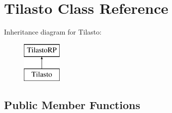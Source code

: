 \hypertarget{class_tilasto}{\section{Tilasto Class Reference}
\label{class_tilasto}
}
Inheritance diagram for Tilasto\-:\begin{figure}[H]
\begin{center}
\leavevmode
\includegraphics[height=2.000000cm]{class_tilasto}
\end{center}
\end{figure}
\subsection*{Public Member Functions}
